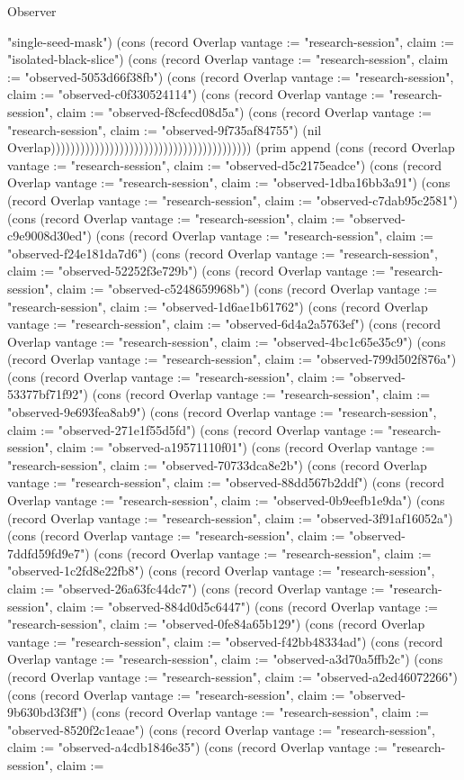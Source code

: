 \begin{lexlean}{Observer}
\begin{semanticmodule}
{"single-seed-mask"}) (cons (record Overlap {vantage := "research-session", claim := "isolated-black-slice"}) (cons (record Overlap {vantage := "research-session", claim := "observed-5053d66f38fb"}) (cons (record Overlap {vantage := "research-session", claim := "observed-c0f330524114"}) (cons (record Overlap {vantage := "research-session", claim := "observed-f8cfecd08d5a"}) (cons (record Overlap {vantage := "research-session", claim := "observed-9f735af84755"}) (nil Overlap))))))))))))))))))))))))))))))))))))))))) (prim append (cons (record Overlap {vantage := "research-session", claim := "observed-d5c2175eadce"}) (cons (record Overlap {vantage := "research-session", claim := "observed-1dba16bb3a91"}) (cons (record Overlap {vantage := "research-session", claim := "observed-c7dab95c2581"}) (cons (record Overlap {vantage := "research-session", claim := "observed-c9e9008d30ed"}) (cons (record Overlap {vantage := "research-session", claim := "observed-f24e181da7d6"}) (cons (record Overlap {vantage := "research-session", claim := "observed-52252f3e729b"}) (cons (record Overlap {vantage := "research-session", claim := "observed-c5248659968b"}) (cons (record Overlap {vantage := "research-session", claim := "observed-1d6ae1b61762"}) (cons (record Overlap {vantage := "research-session", claim := "observed-6d4a2a5763ef"}) (cons (record Overlap {vantage := "research-session", claim := "observed-4bc1c65e35c9"}) (cons (record Overlap {vantage := "research-session", claim := "observed-799d502f876a"}) (cons (record Overlap {vantage := "research-session", claim := "observed-53377bf71f92"}) (cons (record Overlap {vantage := "research-session", claim := "observed-9e693fea8ab9"}) (cons (record Overlap {vantage := "research-session", claim := "observed-271e1f55d5fd"}) (cons (record Overlap {vantage := "research-session", claim := "observed-a19571110f01"}) (cons (record Overlap {vantage := "research-session", claim := "observed-70733dca8e2b"}) (cons (record Overlap {vantage := "research-session", claim := "observed-88dd567b2ddf"}) (cons (record Overlap {vantage := "research-session", claim := "observed-0b9eefb1e9da"}) (cons (record Overlap {vantage := "research-session", claim := "observed-3f91af16052a"}) (cons (record Overlap {vantage := "research-session", claim := "observed-7ddfd59fd9e7"}) (cons (record Overlap {vantage := "research-session", claim := "observed-1c2fd8e22fb8"}) (cons (record Overlap {vantage := "research-session", claim := "observed-26a63fc44dc7"}) (cons (record Overlap {vantage := "research-session", claim := "observed-884d0d5c6447"}) (cons (record Overlap {vantage := "research-session", claim := "observed-0fe84a65b129"}) (cons (record Overlap {vantage := "research-session", claim := "observed-f42bb48334ad"}) (cons (record Overlap {vantage := "research-session", claim := "observed-a3d70a5ffb2c"}) (cons (record Overlap {vantage := "research-session", claim := "observed-a2ed46072266"}) (cons (record Overlap {vantage := "research-session", claim := "observed-9b630bd3f3ff"}) (cons (record Overlap {vantage := "research-session", claim := "observed-8520f2c1eaae"}) (cons (record Overlap {vantage := "research-session", claim := "observed-a4cdb1846e35"}) (cons (record Overlap {vantage := "research-session", claim := }
\end{semanticmodule}
\end{lexlean}
